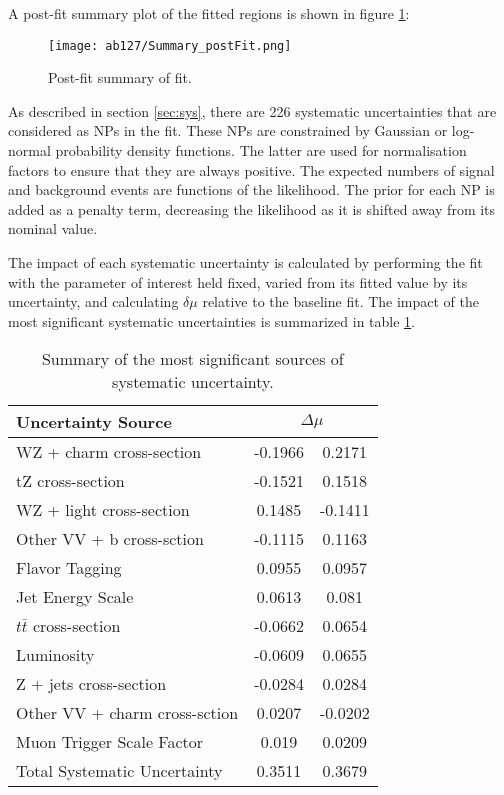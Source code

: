 A post-fit summary plot of the fitted regions is shown in figure \ref{fig:fit_results}: 

\begin{figure}[H]
    \center
    \texttt{[image: ab127/Summary\_postFit.png]}
    \caption{Post-fit summary of fit.}
    \label{fig:fit_results}
\end{figure}

As described in section \ref{sec:sys}, there are 226 systematic uncertainties that are considered as NPs in the fit. These NPs are constrained by Gaussian or log-normal probability density functions. The latter are used for normalisation factors to ensure that they are always positive. The expected numbers
of signal and background events are functions of the likelihood. The prior for each NP is added as a penalty term, decreasing the likelihood as it is shifted away from its nominal value. 

The impact of each systematic uncertainty is calculated by performing the fit with the parameter of interest held fixed, varied from its fitted value by its uncertainty, and calculating $\delta\mu$ relative to the baseline fit.  The impact of the most significant systematic uncertainties is summarized in table \ref{tab:systematics}. 

\begin{table}[H]
    \centering
    \begin{tabular}{l|cc}
        \hline\hline
        Uncertainty Source & \multicolumn{2}{c}{$\Delta \mu$ }  \\
        \hline
        WZ + charm cross-section & -0.1966 & 0.2171 \\
        tZ cross-section & -0.1521 & 0.1518 \\
        WZ + light cross-section & 0.1485 & -0.1411 \\
        Other VV + b cross-sction & -0.1115 & 0.1163 \\
        Flavor Tagging & 0.0955 & 0.0957 \\
        Jet Energy Scale & 0.0613 & 0.081 \\
        $t\bar{t}$ cross-section & -0.0662 & 0.0654 \\
        Luminosity & -0.0609 & 0.0655 \\
        Z + jets cross-section & -0.0284 & 0.0284 \\
        Other VV + charm cross-sction & 0.0207 & -0.0202 \\
        Muon Trigger Scale Factor & 0.019 & 0.0209 \\
        \hline
        Total Systematic Uncertainty & 0.3511 & 0.3679 \\
        \hline\hline
    \end{tabular}
    \caption{Summary of the most significant sources of systematic uncertainty.}
    \label{tab:systematics}
\end{table}

